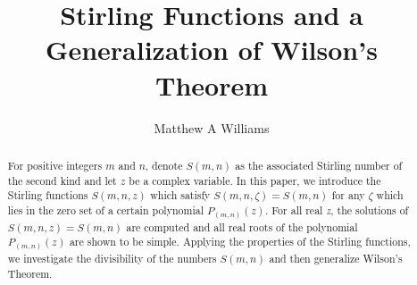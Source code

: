 \documentclass[]{amsart}
\title{Stirling Functions and a Generalization of Wilson's Theorem}
\author{Matthew A Williams}
\begin{document}
\maketitle
\begin{abstract}
For positive integers $m$ and $n$, denote $S(m,n)$ as the associated Stirling number of the second kind and let $z$ be a complex variable.  In this paper, we introduce the Stirling functions $S(m,n,z)$ which satisfy $S(m,n,\zeta) = S(m,n)$ for any $\zeta$ which lies in the zero set of a certain polynomial $P_{(m,n)}(z)$. For all real \textit{z}, the solutions of $S(m,n,z) = S(m,n)$ are computed and all real roots of the polynomial $P_{(m,n)}(z)$ are shown to be simple.  Applying the properties of the Stirling functions, we investigate the divisibility of the numbers $S(m,n)$ and then generalize Wilson's Theorem.
\end{abstract}
\newtheorem{thm}{Theorem}
\newtheorem{prop}{Proposition}
\newtheorem{cor}{Corollary}
\newtheorem{lem}{Lemma}
\raggedbottom
\end{document}
